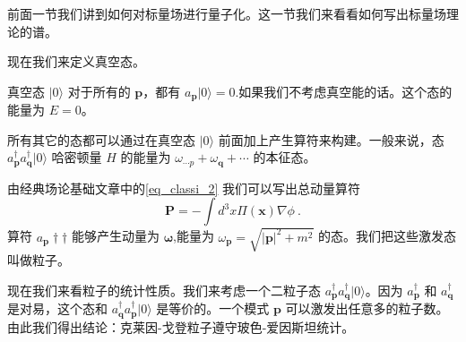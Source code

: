
前面一节我们讲到如何对标量场进行量子化。这一节我们来看看如何写出标量场理论的谱。

现在我们来定义真空态。
\begin{definition}{真空态 $|0\rangle$}
对于所有的 $\mathbf p$，都有 $a_{\mathbf p}|0\rangle=0$.如果我们不考虑真空能的话。这个态的能量为 $E=0$。
\end{definition}
所有其它的态都可以通过在真空态 $|0\rangle$ 前面加上产生算符来构建。一般来说，态 $a^\dagger_{\mathbf p}a^\dagger_{\mathbf q}|0\rangle$ 哈密顿量 $H$ 的能量为 $\omega_{\mathbf\cdots p}+\omega_{\mathbf q}+\cdots$ 的本征态。

由经典场论基础文章中的\autoref{eq_classi_2} 我们可以写出总动量算符
\begin{equation}
\mathbf P = -\int d^3 x \Pi(\mathbf x)  \nabla \phi ~.
\end{equation}
算符 $a_{\mathbf p}\dagger\dagger$ 能够产生动量为 $\mathbf \omega$,能量为 $\omega_{\mathbf p} = \sqrt{|\mathbf p|^2+m^2}$ 的态。我们把这些激发态叫做粒子。

现在我们来看粒子的统计性质。我们来考虑一个二粒子态 $a^\dagger_{\mathbf  p}a^\dagger_{\mathbf q}| 0 \rangle$。因为 $a^\dagger_{\mathbf p}$ 和 $a^\dagger_{\mathbf q}$ 是对易，这个态和 $a^\dagger_{\mathbf q}a^\dagger_{\mathbf p}| 0 \rangle$ 是等价的。一个模式 $\mathbf p$ 可以激发出任意多的粒子数。由此我们得出结论：克莱因-戈登粒子遵守玻色-爱因斯坦统计。

